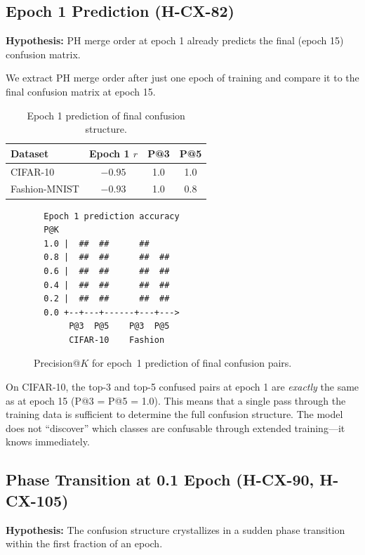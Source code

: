 \documentclass[11pt,a4paper]{article}
\begin{document}
\subsection{Epoch 1 Prediction (H-CX-82)}

\textbf{Hypothesis:} PH merge order at epoch 1 already predicts the final (epoch 15) confusion matrix.

We extract PH merge order after just one epoch of training and compare it to the final confusion matrix at epoch 15.

\begin{table}[htbp]
\centering
\caption{Epoch 1 prediction of final confusion structure.}
\label{tab:epoch1}
\begin{tabular}{lccc}
\toprule
Dataset & Epoch 1 $r$ & P@3 & P@5 \\
\midrule
CIFAR-10      & $-0.95$ & 1.0 & 1.0 \\
Fashion-MNIST & $-0.93$ & 1.0 & 0.8 \\
\bottomrule
\end{tabular}
\end{table}

\begin{figure}[htbp]
\centering
\begin{verbatim}
  Epoch 1 prediction accuracy
  P@K
  1.0 |  ##  ##      ##
  0.8 |  ##  ##      ##  ##
  0.6 |  ##  ##      ##  ##
  0.4 |  ##  ##      ##  ##
  0.2 |  ##  ##      ##  ##
  0.0 +--+---+------+---+--->
       P@3  P@5    P@3  P@5
       CIFAR-10    Fashion
\end{verbatim}
\caption{Precision@$K$ for epoch~1 prediction of final confusion pairs.}
\label{fig:epoch1}
\end{figure}

On CIFAR-10, the top-3 and top-5 confused pairs at epoch 1 are \emph{exactly} the same as at epoch 15 (P@3 = P@5 = 1.0). This means that a single pass through the training data is sufficient to determine the full confusion structure. The model does not ``discover'' which classes are confusable through extended training---it knows immediately.

\subsection{Phase Transition at 0.1 Epoch (H-CX-90, H-CX-105)}

\textbf{Hypothesis:} The confusion structure crystallizes in a sudden phase transition within the first fraction of an epoch.
\end{document}
